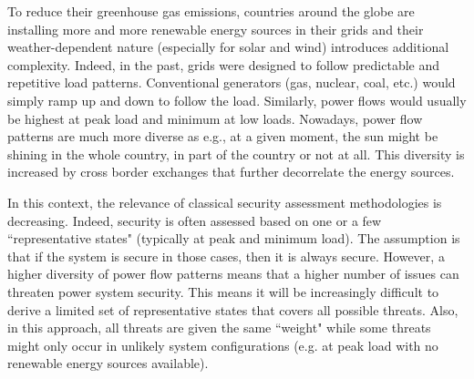 To reduce their greenhouse gas emissions, countries around the globe are installing more and more renewable energy sources in their grids and their weather-dependent nature (especially for solar and wind) introduces additional complexity. Indeed, in the past, grids were designed to follow predictable and repetitive load patterns. Conventional generators (gas, nuclear, coal, etc.) would simply ramp up and down to follow the load. Similarly, power flows would usually be highest at peak load and minimum at low loads.
Nowadays, power flow patterns are much more diverse as e.g., at a given moment, the sun might be shining in the whole country, in part of the country or not at all. This diversity is increased by cross border exchanges that further decorrelate the energy sources.

In this context, the relevance of classical security assessment methodologies is decreasing. Indeed, security is often assessed based on one or a few ``representative states" (typically at peak and minimum load).
The assumption is that if the system is secure in those cases, then it is always secure. However, a higher diversity of power flow patterns means that a higher number of issues can threaten power system security. This means it will be increasingly difficult to derive a limited set of representative states that covers all possible threats. Also, in this approach, all threats are given the same ``weight" while some threats might only occur in unlikely system configurations (e.g. at peak load with no renewable energy sources available).


